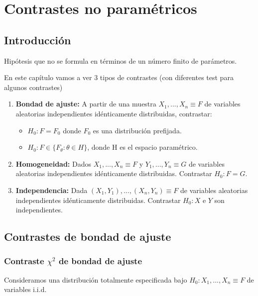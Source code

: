 \chapter{Contrastes no paramétricos}
\section{Introducción}
\begin{defn}Hipótesis que no se formula en términos de un número finito de parámetros.\end{defn}

En este capítulo vamos a ver 3 tipos de contrastes (con diferentes test para algunos contrastes)
\begin{enumerate}
\item \textbf{Bondad de ajuste:} A partir de una muestra $X_1,...,X_n \equiv F$ de variables aleatorias independientes idénticamente distribuidas, contrastar:
\begin{itemize}
\item $H_0: F=F_0$ donde $F_0$ es una distribución prefijada.
\item $H_0: F \in \{F_{\theta} : {\theta}\in H\}$, donde H es el espacio paramétrico.
\end{itemize}
\item \textbf{Homogeneidad:} Dados $X_1,...,X_n \equiv F$ y $Y_1,...,Y_n \equiv G$ de variables aleatorias independientes idénticamente distribuidas. Contrastar $H_0: F=G$.
\item \textbf{Independencia:} Dada $(X_1,Y_1),...,(X_n,Y_n) \equiv F$ de variables aleatorias independientes idénticamente distribuidas. Contrastar $H_0: X$ e $Y$ son independientes.
\end{enumerate}



\section{Contrastes de bondad de ajuste}

\subsection{Contraste $\chi^2$ de bondad de ajuste}
Consideramos una distribución totalmente especificada bajo $H_0: X_1,...,X_n \equiv F$ de variables i.i.d.

